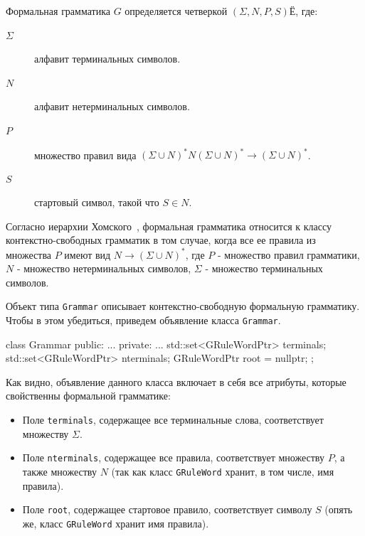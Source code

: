 \begin{mydefinition}
Формальная грамматика $G$ определяется четверкой $(\Sigma, N, P, S)$Ё\autocite{formal-grammar}, где:
\begin{description}
  \item[$\Sigma$] алфавит терминальных символов.
  \item[$N$] алфавит нетерминальных символов.
  \item[$P$] множество правил вида $(\Sigma \cup N)^{*}N(\Sigma \cup N)^{*} \rightarrow (\Sigma \cup N)^{*}$.
  \item[$S$] стартовый символ, такой что $S \in N$.
\end{description}
\end{mydefinition}

\begin{mydefinition}
\label{def:ContextFreeGrammar}
Согласно иерархии Хомского~\autocite{homsky-hierarchy}, формальная грамматика относится к классу контекстно-свободных грамматик в том случае, когда все ее правила из множества $P$ имеют вид $N \rightarrow (\Sigma \cup N)^{*}$, где $P$ - множество правил грамматики, $N$ - множество нетерминальных символов, $\Sigma$ - множество терминальных символов.
\end{mydefinition}

Объект типа \lstinline{Grammar} описывает контекстно-свободную формальную грамматику. Чтобы в этом убедиться, приведем объявление класса \lstinline{Grammar}.
\begin{Verb}
class Grammar {
public:
    ...
private:
    ...
    std::set<GRuleWordPtr> terminals;
    std::set<GRuleWordPtr> nterminals;
    GRuleWordPtr root = nullptr;
};
\end{Verb}
Как видно, объявление данного класса включает в себя все атрибуты, которые свойственны формальной грамматике:
\begin{itemize}
  \item Поле \lstinline{terminals}, содержащее все терминальные слова, соответствует множеству $\Sigma$.
  \item Поле \lstinline{nterminals}, содержащее все правила, соответствует множеству $P$, а также множеству $N$ (так как класс \lstinline{GRuleWord} хранит, в том числе, имя правила).
  \item Поле \lstinline{root}, содержащее стартовое правило, соответствует символу $S$ (опять же, класс \lstinline{GRuleWord} хранит имя правила).
\end{itemize}

